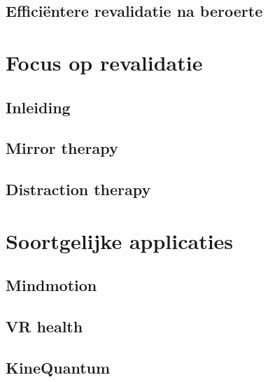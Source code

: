 \subsection{Efficiëntere revalidatie na beroerte}  

\section{Focus op revalidatie}
\subsection{Inleiding}
\subsection{Mirror therapy}
\subsection{Distraction therapy}

\section{Soortgelijke applicaties}
\subsection{Mindmotion}
\subsection{VR health}
\subsection{KineQuantum}


